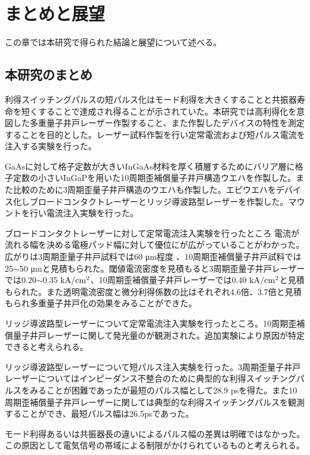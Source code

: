 
\chapter{まとめと展望}
この章では本研究で得られた結論と展望について述べる。
\section{本研究のまとめ}%
利得スイッチングパルスの短パルス化はモード利得を大きくすることと共振器寿命を短くすることで達成され得ることが示されていた。本研究では高利得化を意図した多重量子井戸レーザー作製すること、また作製したデバイスの特性を測定することを目的とした。レーザー試料作製を行い定常電流および短パルス電流を注入する実験を行った。

GaAsに対して格子定数が大きいInGaAs材料を厚く積層するためにバリア層に格子定数の小さいInGaPを用いた10周期歪補償量子井戸構造ウエハを作製した。また比較のために3周期歪量子井戸構造のウエハも作製した。エピウエハをデバイス化しブロードコンタクトレーザーとリッジ導波路型レーザーを作製した。マウントを行い電流注入実験を行った。

ブロードコンタクトレーザーに対して定常電流注入実験を行ったところ
電流が流れる幅を決める電極パッド幅に対して優位にが広がっていることがわかった。広がりは3周期歪量子井戸試料では60 \si{\micro\metre}程度
、10周期歪補償量子井戸試料では25$\sim$50 \si{\micro\metre}と見積もられた。閾値電流密度を見積もると3周期歪量子井戸レーザーでは0.20$\sim$0.35 $\rm{kA/cm^{2}}$、10周期歪補償量子井戸レーザーでは0.40 $\rm{kA/cm^2}$と見積もられた。また透明電流密度と微分利得係数の比はそれぞれ4.6倍、3.7倍と見積もられ多重量子井戸化の効果をみることができた。

リッジ導波路型レーザーについて定常電流注入実験を行ったところ。10周期歪補償量子井戸レーザーに関して発光量のが観測された。追加実験により原因が特定できると考えられる。


リッジ導波路型レーザーについて短パルス注入実験を行った。3周期歪量子井戸レーザーについてはインピーダンス不整合のために典型的な利得スイッチングパルスをみることが困難であったが最短のパルス幅として28.9 psを得た。また10周期歪補償量子井戸レーザーに関しては典型的な利得スイッチングパルスを観測することができ、最短パルス幅は26.5psであった。

モード利得あるいは共振器長の違いによるパルス幅の差異は明確ではなかった。この原因として電気信号の帯域による制限がかけられているものと考えられる。

